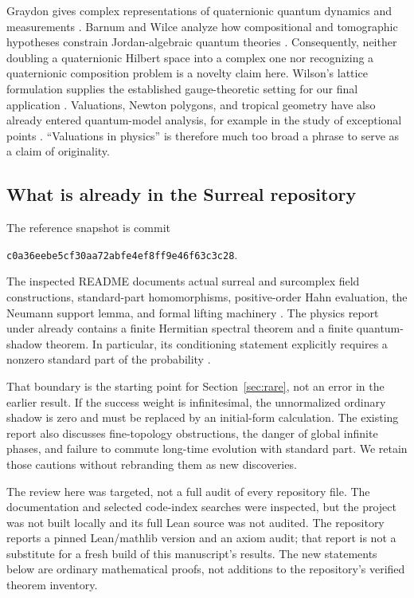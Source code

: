 \documentclass[11pt,oneside]{article}
\numberwithin{equation}{section}
\theoremstyle{plain}
\theoremstyle{definition}
\theoremstyle{remark}
\begin{document}
Graydon gives complex representations of quaternionic quantum dynamics and measurements \cite{Graydon}. Barnum and Wilce analyze how compositional and tomographic hypotheses constrain Jordan-algebraic quantum theories \cite{BarnumWilce}. Consequently, neither doubling a quaternionic Hilbert space into a complex one nor recognizing a quaternionic composition problem is a novelty claim here. Wilson's lattice formulation supplies the established gauge-theoretic setting for our final application \cite{Wilson}. Valuations, Newton polygons, and tropical geometry have also already entered quantum-model analysis, for example in the study of exceptional points \cite{BanerjeeEtAl}. ``Valuations in physics'' is therefore much too broad a phrase to serve as a claim of originality.

\subsection{What is already in the Surreal repository}
The reference snapshot is commit
\begin{center}
\small\texttt{c0a36eebe5cf30aa72abfe4ef8ff9e46f63c3c28}.
\end{center}
The inspected README documents actual surreal and surcomplex field constructions, standard-part homomorphisms, positive-order Hahn evaluation, the Neumann support lemma, and formal lifting machinery \cite{repo}. The physics report under  already contains a finite Hermitian spectral theorem and a finite quantum-shadow theorem. In particular, its conditioning statement explicitly requires a nonzero standard part of the probability \cite{repoPhysics}.

That boundary is the starting point for Section~\ref{sec:rare}, not an error in the earlier result. If the success weight is infinitesimal, the unnormalized ordinary shadow is zero and must be replaced by an initial-form calculation. The existing report also discusses fine-topology obstructions, the danger of global infinite phases, and failure to commute long-time evolution with standard part. We retain those cautions without rebranding them as new discoveries.

The review here was targeted, not a full audit of every repository file. The documentation and selected code-index searches were inspected, but the project was not built locally and its full Lean source was not audited. The repository reports a pinned Lean/mathlib version and an axiom audit; that report is not a substitute for a fresh build of this manuscript's results. The new statements below are ordinary mathematical proofs, not additions to the repository's verified theorem inventory.
\end{document}
